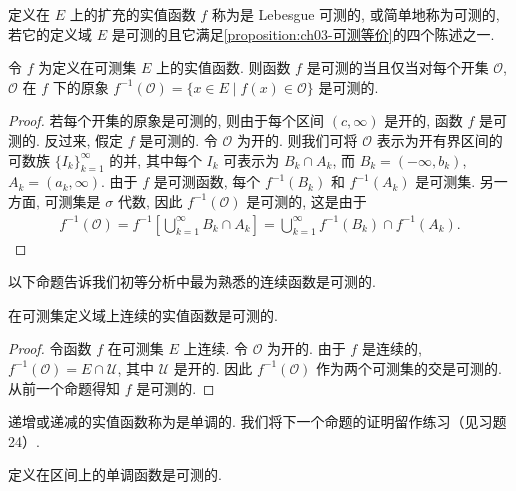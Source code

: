 \documentclass[../../main.tex]{subfiles}
\begin{document}
\begin{definition}\label{definition:ch03-可测函数}
定义在 $E$ 上的扩充的实值函数 $f$ 称为是 Lebesgue 可测的, 或简单地称为可测的, 若它的定义域 $E$ 是可测的且它满足\cref{proposition:ch03-可测等价}的四个陈述之一.
\end{definition}

\begin{proposition}\label{proposition:ch03-开集原象}
令 $f$ 为定义在可测集 $E$ 上的实值函数. 则函数 $f$ 是可测的当且仅当对每个开集 $\mathcal{O}$, $\mathcal{O}$ 在 $f$ 下的原象 $f^{-1}(\mathcal{O})=\{x\in E\mid f(x)\in\mathcal{O}\}$ 是可测的.
\end{proposition}

\begin{proof}
若每个开集的原象是可测的, 则由于每个区间 $(c,\infty)$ 是开的, 函数 $f$ 是可测的. 反过来, 假定 $f$ 是可测的. 令 $\mathcal{O}$ 为开的. 则我们可将 $\mathcal{O}$ 表示为开有界区间的可数族 $\{I_{k}\}_{k=1}^{\infty}$ 的并, 其中每个 $I_{k}$ 可表示为 $B_{k}\cap A_{k}$, 而 $B_{k}=(-\infty,b_{k})$, $A_{k}=(a_{k},\infty)$. 由于 $f$ 是可测函数, 每个 $f^{-1}(B_{k})$ 和 $f^{-1}(A_{k})$ 是可测集. 另一方面, 可测集是 $\sigma$ 代数, 因此 $f^{-1}(\mathcal{O})$ 是可测的, 这是由于
\begin{align*}
f^{-1}(\mathcal{O})=f^{-1}\left[\bigcup_{k=1}^{\infty}B_{k}\cap A_{k}\right]=\bigcup_{k=1}^{\infty}f^{-1}(B_{k})\cap f^{-1}(A_{k}).
\end{align*}
\end{proof}

以下命题告诉我们初等分析中最为熟悉的连续函数是可测的.

\begin{proposition}\label{proposition:ch03-连续可测}
在可测集定义域上连续的实值函数是可测的.
\end{proposition}

\begin{proof}
令函数 $f$ 在可测集 $E$ 上连续. 令 $\mathcal{O}$ 为开的. 由于 $f$ 是连续的, $f^{-1}(\mathcal{O})=E\cap\mathcal{U}$, 其中 $\mathcal{U}$ 是开的. 因此 $f^{-1}(\mathcal{O})$ 作为两个可测集的交是可测的. 从前一个命题得知 $f$ 是可测的.
\end{proof}

递增或递减的实值函数称为是单调的. 我们将下一个命题的证明留作练习（见习题 24）.

\begin{proposition}\label{proposition:ch03-单调可测}
定义在区间上的单调函数是可测的.
\end{proposition}
\end{document}
